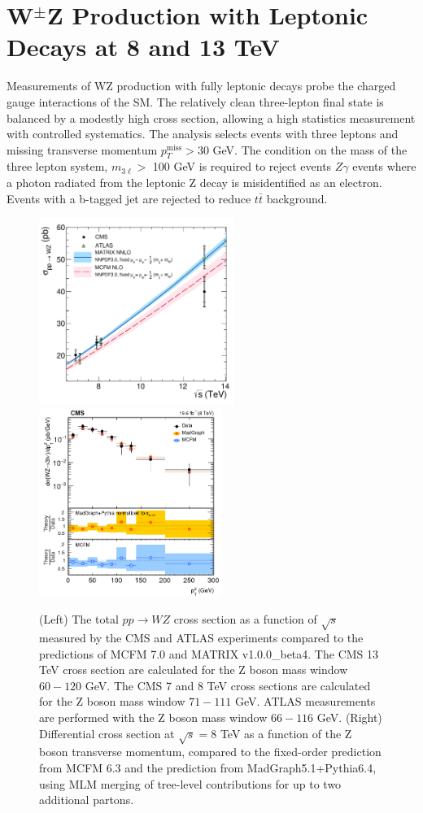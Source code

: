 \documentclass[10pt]{article}
\begin{document}
\section{W$^{\pm}$Z Production with Leptonic Decays at 8 and 13 TeV}

Measurements of WZ production with fully leptonic decays probe the charged
gauge interactions of the SM. The relatively clean three-lepton final state
is balanced by a modestly high cross section, allowing a high statistics measurement 
with controlled systematics. The analysis selects events with three leptons and 
missing transverse momentum $p_{T}^{\mathrm{miss}} > 30$ GeV. The condition on the
mass of the three lepton system,
$m_{3\ell} > $ 100 GeV is required to reject events $Z\gamma$ events where a photon
radiated from the leptonic Z decay is misidentified as an electron. Events with
a b-tagged jet are rejected to reduce $t\bar{t}$ background.

\begin{figure}[htb]
  \centering
    \includegraphics[height=2.4in]{figures/WZCrossSection_vs_sqrtS.pdf}
    \includegraphics[height=2.4in]{figures/WZ8TeV_ptZ_unfolded.png}
    \caption{ (Left) The total $pp \rightarrow WZ$ cross section
      as a function of $\sqrt{s}$ measured by the CMS and 
      ATLAS experiments compared to the predictions of MCFM 7.0 and MATRIX v1.0.0\_beta4. 
      The CMS 13 TeV cross section are calculated for the Z boson mass window $60 - 120$ GeV. 
      The CMS 7 and 8  TeV  cross sections are calculated for the Z boson mass window $71 - 111$ GeV.
      ATLAS measurements are performed with the Z boson mass window $66 - 116$  GeV.
      (Right) Differential cross section at $\sqrt{s} = 8$ TeV as a function
      of the Z boson transverse momentum, compared to
      the fixed-order prediction from MCFM 6.3 and the prediction from
      MadGraph5.1+Pythia6.4, using MLM merging of tree-level contributions 
      for up to two additional partons.
      }
  \label{fig:WZfigs}
\end{figure}
\end{document}

